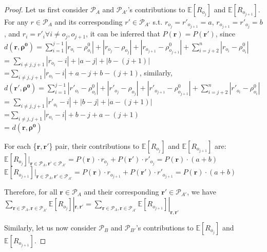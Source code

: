 \documentclass[11pt, oneside]{article}   	%
\begin{document}
\begin{proof}
Let us first consider $\mathcal{P}_A$ and $\mathcal{P}_{A'}$'s contributions to $\mathbb{E}[R_{o_{j}}]$ and $\mathbb{E}[R_{o_{j+1}}]$.
For any $r \in \mathcal{P}_A$ and its corresponding $r' \in \mathcal{P}_{A'}$ s.t. $r_{o_j} = r'_{o_{j+1}} = a$, $r_{o_{j+1}} = r'_{o_{j}} = b$, and $r_i = r'_i \forall i\neq o_j, o_{j+1}$, it can be inferred that $P(\bm{r}) = P(\bm{r'})$, since \\
$d(\bm{r}, \bm{\rho^0}) = \sum\limits_{i=1}^{j-1}|r_{o_i} - \rho^0_{o_i}| + |r_{o_j} - \rho_{o_j}| + |r_{o_{j+1}} - \rho^0_{o_{j+1}}| + \sum\limits_{i = j+2}^{n}|r_{o_i} - \rho^0_{o_{i}}|$ \\
= $\sum\limits_{i \neq j, j+1} |r_{o_i} - i| + |a-j| + |b - (j+1)|$\\
=$\sum\limits_{i \neq j, j+1} |r_{o_i} - i| + a-j + b - (j+1)$, similarly, \\

$d(\bm{r'}, \bm{\rho^0}) = \sum\limits_{i=1}^{j-1}|r'_{o_i} - \rho^0_{o_i}| + |r'_{o_j} - \rho_{o_j}| + |r'_{o_{j+1}} - \rho^0_{o_{j+1}}| + \sum\limits_{i = j+2}^{n}|r'_{o_i} - \rho^0_{o_{i}}|$ \\
= $\sum\limits_{i \neq j, j+1} |r'_{o_i} - i| + |b-j| + |a - (j+1)|$\\
=$\sum\limits_{i \neq j, j+1} |r_{o_i} - i| + b-j + a - (j+1)$ \\
= $d(\bm{r}, \bm{\rho^0}) $

For each \{$\bm{r}, \bm{r'}$\} pair, their contributions to $\mathbb{E}[R_{o_j}]$ and $\mathbb{E}[R_{o_{j+1}}]$ are: \\
$\mathbb{E}[R_{o_j}]|_{\bm{r}\in \mathcal{P}_A,\bm{r'}\in \mathcal{P}_{A'}} = P(\bm{r})\cdot r_{o_j} + P(\bm{r'})\cdot r'_{o_j} = P(\bm{r})\cdot (a+b) $ \\

$\mathbb{E}[R_{o_{j+1}}]|_{\bm{r}\in \mathcal{P}_A,\bm{r'}\in \mathcal{P}_{A'}} = P(\bm{r})\cdot r_{o_{j+1}} + P(\bm{r'})\cdot r'_{o_{j+1}} = P(\bm{r})\cdot (a+b)$ 

Therefore, for all $\bm{r}\in \mathcal{P}_A$ and their corresponding $\bm{r'}\in \mathcal{P}_{A'}$, we have \\
$\sum\limits_{\bm{r}\in \mathcal{P}_A, \bm{r}\in \mathcal{P}_{A'}}\mathbb{E}[R_{o_j}] |_{\bm{r}, \bm{r'}} = \sum\limits_{\bm{r}\in \mathcal{P}_A, \bm{r}\in \mathcal{P}_{A'}}\mathbb{E}[R_{o_{j+1}}] |_{\bm{r}, \bm{r'}}$

Similarly, let us now consider $\mathcal{P}_B$ and $\mathcal{P}_{B'}$'s contributions to $\mathbb{E}[R_{o_{j}}]$ and $\mathbb{E}[R_{o_{j+1}}]$.


\end{proof}
\end{document}
